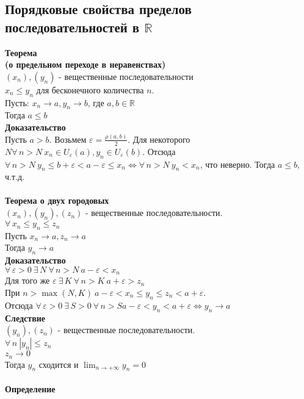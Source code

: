 \documentclass[12pt]{article}
\begin{document}
\subsection{Порядковые свойства пределов последовательностей в $\mathbb{R}$}
\textbf{Теорема\\(о предельном переходе в неравенствах)}\\
$(x_n),(y_n)$ - вещественные последовательности\\
$x_n\leq y_n$ для бесконечного количества $n$.\\
Пусть: $x_n\rightarrow a, y_n \rightarrow b$, где $a,b \in \mathbb{R}$\\
Тогда $a\leq b$\\
\textbf{Доказательство}\\
Пусть $a > b$. Возьмем $\varepsilon = \frac{\rho(a,b)}{2}$. Для некоторого $N \forall\,n>N\ x_n \in U_\varepsilon(a), y_n \in U_\varepsilon(b)$. Отсюда $\forall\,n>N\ y_n \leq b+\varepsilon < a-\varepsilon \leq x_n \Leftrightarrow \forall\,n > N\ y_n < x_n$, что неверно. Тогда $a \leq b$, ч.т.д.\\\\
\textbf{Теорема о двух городовых}\\
$(x_n),(y_n),(z_n)$ - вещественные последовательности.\\
$\forall\,x_n\leq y_n \leq z_n$\\
Пусть $x_n \rightarrow a, z_n \rightarrow a$\\
Тогда $y_n \rightarrow a$\\
\textbf{Доказательство}\\
$\forall\,\varepsilon >0\ \exists\,N\ \forall\,n>N\ a-\varepsilon<x_n$\\
Для того же $\varepsilon\ \exists\,K\ \forall\,n>K\ a+\varepsilon>z_n$\\
При $n>\max(N,K)\ a-\varepsilon<x_n\leq y_n \leq z_n < a+\varepsilon$.\\
Отсюда $\forall\,\varepsilon>0\ \exists\,S>0\ \forall\,n>S a-\varepsilon<y_n<a+\varepsilon \Leftrightarrow y_n\rightarrow a$\\
\textbf{Следствие}\\
$(y_n),(z_n)$ - вещественные последовательности.\\
$\forall\,n\ |y_n|\leq z_n$\\
$z_n \rightarrow 0$\\
Тогда $y_n$ сходится и $\lim_{n\rightarrow +\infty}{y_n}=0$\\\\
\textbf{Определение}\\
\end{document}
